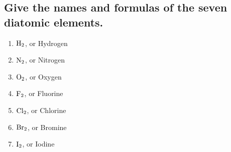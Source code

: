 \documentclass[11pt]{article}
\begin{document}
\subsection{Give the names and formulas of the seven diatomic elements.}
\label{sec:org73b7a34}
\begin{enumerate}
\item \(\ce{H2}\), or Hydrogen
\item \(\ce{N2}\), or Nitrogen
\item \(\ce{O2}\), or Oxygen
\item \(\ce{F2}\), or Fluorine
\item \(\ce{Cl2}\), or Chlorine
\item \(\ce{Br2}\), or Bromine
\item \(\ce{I2}\), or Iodine
\end{enumerate}
\end{document}
